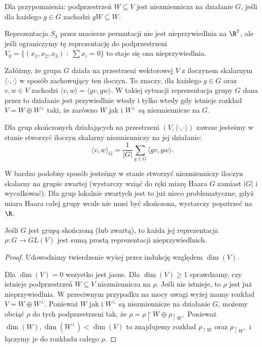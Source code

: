 Dla przypomnienia: podprzestrzeń $W\subseteq V$ jest niezmiennicza na działanie $G$, jeśli dla każdego $g\in G$ zachodzi $gW\subseteq W$.

\begin{example}
  Reprezentacja $S_3$ przez macierze permutacji nie jest nieprzywiedlnia na $\R^3$, ale jeśli ograniczymy tę reprezentację do podprzestrzeni $V_0=\{(x_1,x_2,x_3)\;:\;\sum x_i=0\}$ to staje się ona nieprzywiedlnia.
\end{example}

Załóżmy, że grupa $G$ działa na przestrzeni wektorowej $V$ z iloczynem skalarnym $\langle\cdot,\cdot\rangle$ w sposób zachowujący ten iloczyn. To znaczy, dla każdego $g\in G$ oraz $v,w\in V$ zachodzi $\langle v,w\rangle=\langle gv,gw\rangle$. W takiej sytuacji reprezentacja grupy $G$ dana przez to działanie jest przywiedlnie wtedy i tylko wtedy gdy istnieje rozkład $V=W\oplus W^\perp$ taki, że zarówno $W$ jak i $W^\perp$ są niezmiennicze na $G$.

Dla grup skończonych działających na przestrzeni $(V, \langle\cdot,\cdot\rangle)$ zawsze jesteśmy w stanie stworzyć iloczyn skalarny niezmienniczy na jej działanie: 
$$\langle v,w\rangle_G=\frac{1}{|G|}\sum_{g\in G}\langle gv, gw\rangle.$$

W bardzo podobny sposób jesteśmy w stanie stworzyć niezmienniczy iloczyn skalarny na grupie zwartej (wystarczy wziąć do ręki miarę Haara $G$ zamiast $|G|$ i wycałkować). Dla grup lokalnie zwartych jest to już nieco problematyczne, gdyż miara Haara całej grupy wcale nie musi być skończona, wystarczy popatrzeć na $\R$.

\begin{theorem}{}{}
  Jeśli $G$ jest grupą skończoną (lub zwartą), to każda jej reprezentacja $\rho:G\to GL(V)$ jest sumą prostą reprezentacji nieprzywiedlnich.
\end{theorem}

\begin{proof}
  Udowodnimy twierdzenie wyżej przez indukcję względem $\dim(V)$.

  Dla $\dim(V)=0$ wszystko jest jasne. Dla $\dim(V)\geq 1$ sprawdzamy, czy istnieje podprzestrzeń $W\subseteq V$ niezmiennicza na $\rho$. Jeśli nie istnieje, to $\rho$ jest już nieprzywiedlnia. W przeciwnym przypadku na mocy uwagi wyżej mamy rozkład $V=W\oplus W^\perp$. Ponieważ $W$ jak i $W^\perp$ są niezmiennicze na działanie $G$, możemy obciąć $\rho$ do tych podprzestrzeni tak, że $\rho=\rho\restriction{W}\oplus \rho_{\upharpoonright W^\perp}$
  Ponieważ $\dim(W), \dim(W^\perp)<\dim(V)$ to znajdujemy rozkład $\rho_{\upharpoonright W}$ oraz $\rho_{\upharpoonright W^\perp}$ i łączymy je do rozkładu całego $\rho$.
\end{proof}

